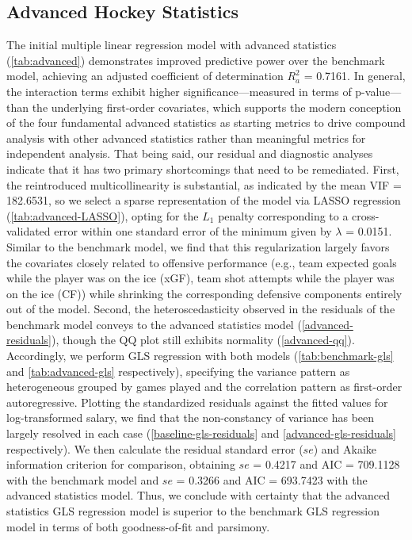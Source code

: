 \documentclass[10pt]{article}
\begin{document}
\subsection{Advanced Hockey Statistics}
The initial multiple linear regression model with advanced statistics (\autoref{tab:advanced}) demonstrates improved predictive power over the benchmark model, achieving an adjusted coefficient of determination $R^2_a$ = 0.7161. In general, the interaction terms exhibit higher significance—measured in terms of p-value—than the underlying first-order covariates, which supports the modern conception of the four fundamental advanced statistics as starting metrics to drive compound analysis with other advanced statistics rather than meaningful metrics for independent analysis. That being said, our residual and diagnostic analyses indicate that it has two primary shortcomings that need to be remediated. 
First, the reintroduced multicollinearity is substantial, as indicated by the mean VIF = 182.6531, so we select a sparse representation of the model via LASSO regression (\autoref{tab:advanced-LASSO}), opting for the $L_1$ penalty corresponding to a cross-validated error within one standard error of the minimum given by $\lambda$ = 0.0151. Similar to the benchmark model, we find that this regularization largely favors the covariates closely related to offensive performance (e.g., team expected goals while the player was on the ice (xGF), team shot attempts while the player was on the ice (CF)) while shrinking the corresponding defensive components entirely out of the model.
Second, the heteroscedasticity observed in the residuals of the benchmark model conveys to the advanced statistics model (\autoref{advanced-residuals}), though the QQ plot still exhibits normality (\autoref{advanced-qq}). Accordingly, we perform GLS regression with both models (\autoref{tab:benchmark-gls} and \autoref{tab:advanced-gls} respectively), specifying the variance pattern as heterogeneous grouped by games played and the correlation pattern as first-order autoregressive. Plotting the standardized residuals against the fitted values for log-transformed salary, we find that the non-constancy of variance has been largely resolved in each case (\autoref{baseline-gls-residuals} and \autoref{advanced-gls-residuals} respectively). We then calculate the residual standard error ($se$) and Akaike information criterion for comparison, obtaining $se$ = 0.4217 and AIC = 709.1128 with the benchmark model and $se$ = 0.3266 and AIC = 693.7423 with the advanced statistics model. Thus, we conclude with certainty that the advanced statistics GLS regression model is superior to the benchmark GLS regression model in terms of both goodness-of-fit and parsimony.
\end{document}
